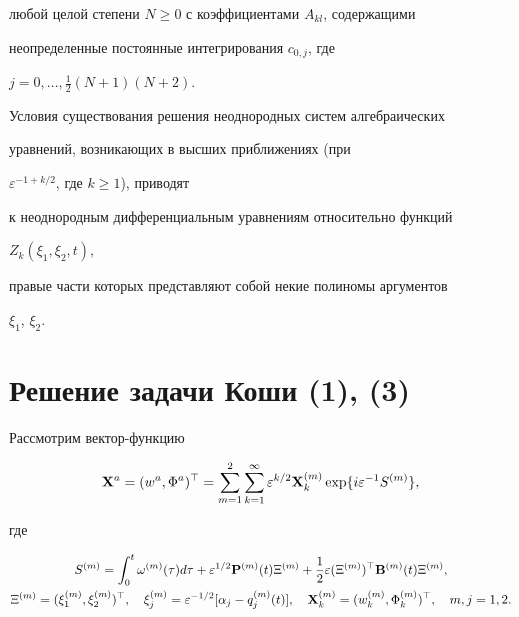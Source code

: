 любой целой степени $N\ge 0$ с коэффициентами $A_{kl}$, содержащими 


неопределенные постоянные интегрирования $c_{0,j}$, где 


$j=0,\dotsc,\frac{1}{2}(N+1)(N+2)$. 


 


Условия существования решения неоднородных систем алгебраических 


уравнений, возникающих в высших приближениях (при 


$\varepsilon^{-1+k/2}$, где $k\ge 1$), приводят 


к неоднородным дифференциальным уравнениям относительно функций 


$Z_k(\xi_1,\xi_2,t)$, 


правые части которых представляют собой некие полиномы аргументов 


$\xi_1$, $\xi_2$. 


 


\section{Решение задачи Коши (1), (3)} 


 


Рассмотрим вектор-функцию 


\begin{equation} 


\BX^a=(w^a,\Phi^a)^\top=\sum^2_{m=1}\sum^\infty_{k=1} 


\varepsilon^{k/2}\BX^{(m)}_k\exp\{i\varepsilon^{-1}S^{(m)}\}, 


\end{equation} 


где 


\begin{gather*} 


S^{(m)}=\int^t_0\omega^{(m)}(\tau)d\tau+ 


\varepsilon^{1/2}\BP^{(m)}(t)\Xi^{(m)}+\frac{1}{2}\varepsilon 


(\Xi^{(m)})^\top\BB^{(m)}(t)\Xi^{(m)},\\ 


\Xi^{(m)}=(\xi^{(m)}_1,\xi^{(m)}_2)^\top,\quad 


\xi^{(m)}_j=\varepsilon^{-1/2}[\alpha_j-q^{(m)}_j(t)],\quad 


\BX^{(m)}_k=(w^{(m)}_k,\Phi^{(m)}_k)^\top,\quad m,j=1,2. 


\end{gather*} 


